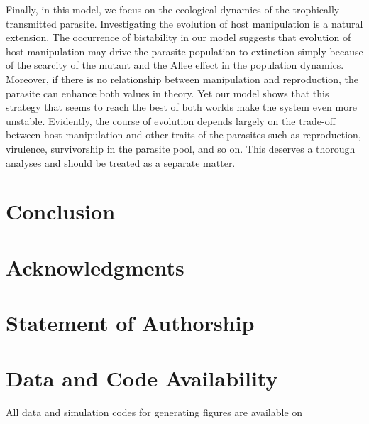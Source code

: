 \documentclass[11pt]{article}
\begin{document}
Finally, in this model, we focus on the ecological dynamics of the trophically transmitted parasite. Investigating the evolution of host manipulation is a natural extension. The occurrence of bistability in our model suggests that evolution of host manipulation may drive the parasite population to extinction simply because of the scarcity of the mutant and the Allee effect in the population dynamics. Moreover, if there is no relationship between manipulation and reproduction, the parasite can enhance both values in theory. Yet our model shows that this strategy that seems to reach the best of both worlds make the system even more unstable. Evidently, the course of evolution depends largely on the trade-off between host manipulation and other traits of the parasites such as reproduction, virulence, survivorship in the parasite pool, and so on. This deserves a thorough analyses and should be treated as a separate matter.

\section*{Conclusion}



 \section*{Acknowledgments}


 \section*{Statement of Authorship}
 
\section*{Data and Code Availability}
All data and simulation codes for generating figures are available on 

\end{document}
